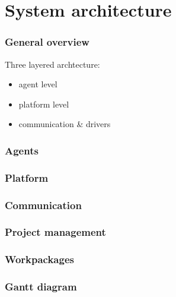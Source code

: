 \documentclass{beamer}
\theoremstyle{definition} \newtheorem{mdefinition}{Definition}
\theoremstyle{plain} \newtheorem{mtheorem}{Theorem}
\theoremstyle{plain} \newtheorem{mcorollary}{Corollary}
\theoremstyle{plain} \newtheorem{mfact}{Fact}
\begin{document}
\section{System architecture}

\begin{frame}
	\frametitle{General overview}
	Three layered archtecture:
		\begin{itemize}
		\item agent level
		\item platform level
		\item communication \& drivers
		\end{itemize}
\end{frame}


\begin{frame}
	\frametitle{Agents}
		

\end{frame}

\begin{frame}
	\frametitle{Platform}

\end{frame}

\begin{frame}
	\frametitle{Communication}

\end{frame}

\begin{frame}
	\frametitle{Project management}

\end{frame}

\begin{frame}
	\frametitle{Workpackages}

\end{frame}


\begin{frame}
	\frametitle{Gantt diagram}

\end{frame}

\end{document}
